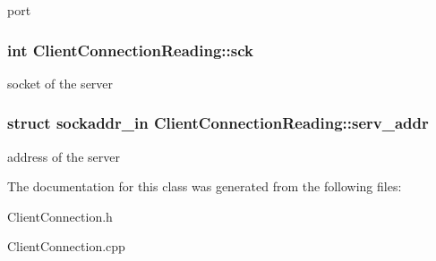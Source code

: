 port \hypertarget{class_client_connection_reading_a813a3291adfb953fba1860ea618ee411}{
\subsubsection[{sck}]{\setlength{\rightskip}{0pt plus 5cm}int Client\-Connection\-Reading\-::sck\hspace{0.3cm}{\ttfamily [private]}}}\label{class_client_connection_reading_a813a3291adfb953fba1860ea618ee411}
socket of the server \hypertarget{class_client_connection_reading_a23b735171d7ab01c3693284038d63077}{
\subsubsection[{serv\-\_\-addr}]{\setlength{\rightskip}{0pt plus 5cm}struct sockaddr\-\_\-in Client\-Connection\-Reading\-::serv\-\_\-addr\hspace{0.3cm}{\ttfamily [private]}}}\label{class_client_connection_reading_a23b735171d7ab01c3693284038d63077}
address of the server 

The documentation for this class was generated from the following files\-:\begin{DoxyCompactItemize}
\item 
Client\-Connection.\-h\item 
Client\-Connection.\-cpp\end{DoxyCompactItemize}
